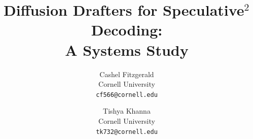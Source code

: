 \documentclass[10pt,twocolumn,letterpaper]{article}
\title{Diffusion Drafters for Speculative$^2$ Decoding: \\ A Systems Study}
\author{Cashel Fitzgerald\\
Cornell University\\
{\tt\small cf566@cornell.edu}
\and
Tishya Khanna\\
Cornell University\\
{\tt\small tk732@cornell.edu}
}
\begin{document}
\maketitle





{
    \small
    
    
}

% 
\end{document}
